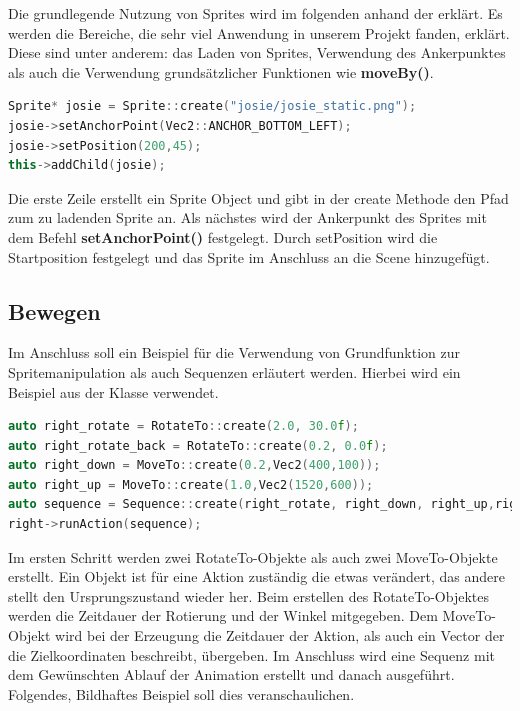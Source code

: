 Die grundlegende Nutzung von Sprites wird im folgenden anhand der  erklärt. Es werden die Bereiche, die sehr viel Anwendung in unserem Projekt fanden, erklärt. Diese sind unter anderem: das Laden von Sprites, Verwendung des Ankerpunktes als auch die Verwendung grundsätzlicher Funktionen wie \textbf{moveBy()}.

\begin{lstlisting}[label=lst:sprite_ancerpoint,
				   language=C++,
				   firstnumber=54,
				   caption=Sprite laden ( TutorialScene.cpp )]
Sprite* josie = Sprite::create("josie/josie_static.png");
josie->setAnchorPoint(Vec2::ANCHOR_BOTTOM_LEFT);
josie->setPosition(200,45);
this->addChild(josie);
\end{lstlisting}

Die erste Zeile erstellt ein Sprite Object und gibt in der create Methode den Pfad zum zu ladenden Sprite an. Als nächstes wird der Ankerpunkt des Sprites mit dem Befehl \textbf{setAnchorPoint()} festgelegt. Durch setPosition wird die Startposition festgelegt und das Sprite im Anschluss an die Scene hinzugefügt. 

\subsection{Bewegen}

Im Anschluss soll ein Beispiel für die Verwendung von Grundfunktion zur Spritemanipulation als auch Sequenzen erläutert werden. Hierbei wird ein Beispiel aus der Klasse  verwendet.

\begin{lstlisting}[label=lst:boss_attack_sequence,
				   language=C++,
				   firstnumber=219,
				   caption=Sequence erstellen ( BossLevel.cpp )]
auto right_rotate = RotateTo::create(2.0, 30.0f);
auto right_rotate_back = RotateTo::create(0.2, 0.0f);
auto right_down = MoveTo::create(0.2,Vec2(400,100));
auto right_up = MoveTo::create(1.0,Vec2(1520,600));
auto sequence = Sequence::create(right_rotate, right_down, right_up,right_rotate_back, nullptr);
right->runAction(sequence);
\end{lstlisting}

Im ersten Schritt werden zwei RotateTo-Objekte als auch zwei MoveTo-Objekte erstellt. Ein Objekt ist für eine Aktion zuständig die etwas verändert, das andere stellt den Ursprungszustand wieder her. Beim erstellen des RotateTo-Objektes werden die Zeitdauer der Rotierung und der Winkel mitgegeben. Dem MoveTo-Objekt wird bei der Erzeugung die Zeitdauer der Aktion, als auch ein Vector der die Zielkoordinaten beschreibt, übergeben. Im Anschluss wird eine Sequenz mit dem Gewünschten Ablauf der Animation erstellt und danach ausgeführt. Folgendes, Bildhaftes Beispiel soll dies veranschaulichen. 

